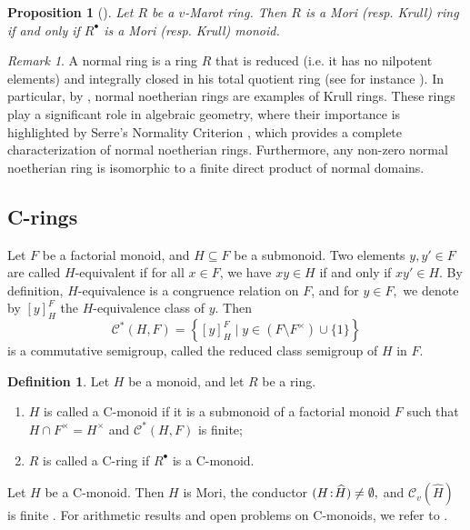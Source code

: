 \documentclass[a4paper, 10pt]{amsart}
\newcommand{\defit}[1]{{\textsf{#1}}}
\theoremstyle{plain}
\newtheorem{proposition}[theorem]{Proposition}
\theoremstyle{definition}
\newtheorem{definition}[theorem]{Definition}
\theoremstyle{remark}
\newtheorem{remark}[theorem]{Remark}
\newcommand{\DP}{\negthinspace : \negthinspace}
\numberwithin{equation}{section}
\begin{document}
\begin{proposition}[{\cite[Theorem 3.5]{GRR15}}] Let $R$ be a $v$-Marot ring. Then $R$ is a Mori \textup(resp. Krull\textup) ring if and only if $R^\bullet$ is a Mori \textup(resp. Krull\textup) monoid.
\end{proposition} 

\begin{remark}
    A normal ring is a ring $R$ that is reduced (i.e. it has no nilpotent elements) and integrally closed in his total quotient ring (see for instance \cite[Chapter 11.2]{Eis95}). In particular, by \cite[Theorem 10.1]{Hu88}, normal noetherian rings are examples of Krull rings. These rings play a significant role in algebraic geometry, where their importance is highlighted by Serre’s Normality Criterion \cite[Theorem 11.5]{Eis95}, which provides a complete characterization of normal noetherian rings. Furthermore, any non-zero normal noetherian ring is isomorphic to a finite direct product of normal domains. 
\end{remark}

\smallskip

\subsection{C-rings}  
    Let $F$ be a factorial monoid, and $H\subseteq F$ be a submonoid. Two elements $y,y'\in F$ are called $H$-\defit{equivalent} if for all $x\in F$, we have $xy\in H$ if and only if $xy'\in H.$ 
By definition, $H$-equivalence is a congruence relation on $F$, and for $y\in F,$ we denote by $[y]_H^F$ the $H$-\defit{equivalence class} of $y.$ 
 Then \[\mathcal{C}^*(H,F)=\left\{[y]_H^F\mid y\in (F\setminus F^\times)\cup \{1\}\right\}\] is a commutative semigroup, called the \defit{reduced class semigroup} of $H$ in $F$.

\begin{definition} Let $H$ be a monoid, and let $R$ be a ring.
\begin{enumerate}
    \item  $H$ is called a C-\defit{monoid} if it is a submonoid of a factorial monoid $F$ such that $H\cap F^\times=H^\times$ and $\mathcal{C}^*(H,F)$ is finite;
    \item $R$ is called a C-\defit{ring} if $R^{\bullet}$ is a C-monoid.
\end{enumerate}
\end{definition}
Let $H$ be a C-monoid. Then $H$ is Mori, the conductor $(H\DP \widehat{H})\ne \emptyset,$ and $\mathcal{C}_v(\widehat{H})$ is finite \cite[Chapter 10]{GHK06}. For arithmetic results and open problems on C-monoids, we refer to \cite{FG05, GHK06, GKL26, Rei13}.
\end{document}
